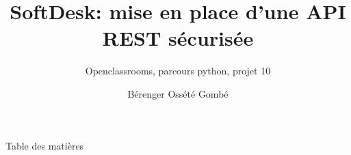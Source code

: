 \documentclass{beamer}
\title{SoftDesk: mise en place d'une API REST sécurisée}
\subtitle{Openclassrooms, parcours python, projet 10}
\author{Bérenger Ossété Gombé}
\begin{document}
\begin{frame}
  \maketitle
\end{frame}

\begin{frame}{Table des matières}
  \tableofcontents
\end{frame}







\end{document}
